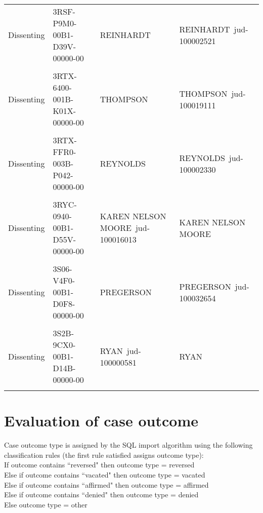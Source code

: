 \documentclass[10pt, letterpaper]{article}
\begin{document}
\begin{spacing}{1.0}
\begin{table}[H]
\begin{tabular}{llp{1.5in}p{2in}}
        Dissenting & 3RSF-P9M0-00B1-D39V-00000-00 & REINHARDT~ & REINHARDT~jud-100002521\\
        & & &\\[-6.25pt]
        Dissenting & 3RTX-6400-001B-K01X-00000-00 & THOMPSON~ & THOMPSON~jud-100019111\\
        & & &\\[-6.25pt]
        Dissenting & 3RTX-FFR0-003B-P042-00000-00 & REYNOLDS~ & REYNOLDS~jud-100002330\\
        & & &\\[-6.25pt]
        Dissenting & 3RYC-0940-00B1-D55V-00000-00 & KAREN NELSON MOORE~jud-100016013 & KAREN NELSON MOORE~\\
        & & &\\[-6.25pt]
        Dissenting & 3S06-V4F0-00B1-D0F8-00000-00 & PREGERSON~ & PREGERSON~jud-100032654\\
        & & &\\[-6.25pt]
        Dissenting & 3S2B-9CX0-00B1-D14B-00000-00 & RYAN~jud-100000581 & RYAN~\\[4pt]
        \hline\\
    \end{tabular}
    \label{tab:exampleDiffAuthor}
\end{table}
    

\clearpage

\section{Evaluation of case outcome}

Case outcome type is assigned by the SQL import algorithm using the following classification rules (the first rule satisfied assigns outcome type):\\

If outcome contains ``reversed" then outcome type = reversed\\
Else if outcome contains ``vacated" then outcome type = vacated\\
Else if outcome contains ``affirmed" then outcome type = affirmed\\
Else if outcome contains ``denied" then outcome type = denied\\
Else outcome type = other\\


\end{spacing}
\end{document}
